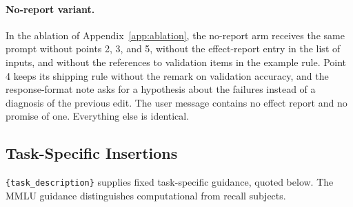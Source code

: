 \documentclass[11pt]{article}
\begin{document}
\paragraph{No-report variant.}
In the ablation of Appendix~\ref{app:ablation}, the no-report arm receives the same prompt without points 2, 3, and 5,
without the effect-report entry in the list of inputs, and without the references to validation items in the example
rule. Point 4 keeps its shipping rule without the remark on validation accuracy, and the response-format note asks for
a hypothesis about the failures instead of a diagnosis of the previous edit. The user message contains no effect
report and no promise of one. Everything else is identical.

\subsection{Task-Specific Insertions}
\label{app:insertions}
\texttt{\{task\_description\}} supplies fixed task-specific guidance, quoted below. The MMLU
guidance distinguishes computational from recall subjects.
\end{document}
